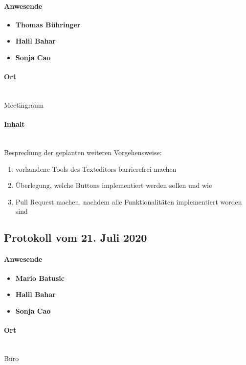 \paragraph{Anwesende}
\begin{itemize}
	\item{\textbf{Thomas Bühringer}}
	\item{\textbf{Halil Bahar}}
	\item{\textbf{Sonja Cao}}
\end{itemize}

\paragraph{Ort}\mbox{}\\
Meetingraum

\paragraph{Inhalt}\mbox{}\\
Besprechung der geplanten weiteren Vorgehensweise:
\begin{enumerate}
	\item vorhandene Tools des Texteditors barrierefrei machen
	\item Überlegung, welche Buttons implementiert werden sollen und wie
	\item Pull Request machen, nachdem alle Funktionalitäten implementiert worden sind
\end{enumerate}

\subsection{Protokoll vom 21. Juli 2020}
\paragraph{Anwesende}
\begin{itemize}
	\item{\textbf{Mario Batusic}}
	\item{\textbf{Halil Bahar}}
	\item{\textbf{Sonja Cao}}
\end{itemize}

\paragraph{Ort}\mbox{}\\
Büro

